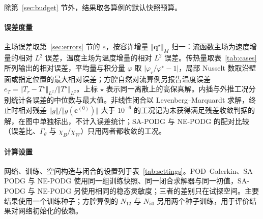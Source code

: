 除第~\ref{sec:budget} 节外，结果取各算例的默认快照预算。

\paragraph{误差度量}
主场误差取第~\ref{sec:errors} 节的 $e$，按容许增量 $\Vert\mathbf q^\star\Vert_M$ 归一：流函数主场为速度增量的相对 $L^2$ 误差，温度主场为温度增量的相对 $L^2$ 误差。传热量取表~\ref{tab:cases} 所列输出的相对误差，平均量与积分量 $\varphi$ 取 $\lvert\varphi_r/\varphi^\star-1\rvert$，局部 Nusselt 数取沿壁面或指定位置的最大相对误差；方腔自然对流算例另报告温度误差 $e_T=\Vert T_r-T^\star\Vert_{L^2}/\Vert T^\star\Vert_{L^2}$。上标 $\star$ 表示同一离散上的高保真解。内插与外推工况分别统计各误差的中位数与最大值。非线性闭合以 Levenberg--Marquardt 求解，终止时相对残差 $\Vert g\Vert/\Vert g(\mathbf c^{(0)})\Vert$ 大于 $10^{-6}$ 的工况记为未获得满足残差收敛判据的解，在图中单独标出，不计入误差统计；SA-PODG 与 NE-PODG 的配对比较（误差比、$\Gamma_\theta$ 与 $\chi_B/\chi_W$）只用两者都收敛的工况。

\paragraph{计算设置}
网络、训练、空间构造与闭合的设置列于表~\ref{tab:settings}。POD--Galerkin、SA-PODG 与 NE-PODG 使用同一组训练快照、同一闭合求解器与同一初值，SA-PODG 与 NE-PODG 另使用相同的稳态灵敏度；三者的差别只在试探空间。主要结果使用一个训练种子；方腔算例的 $N_{12}$ 与 $N_{50}$ 另用两个种子训练，用于评价结果对网络初始化的依赖。

